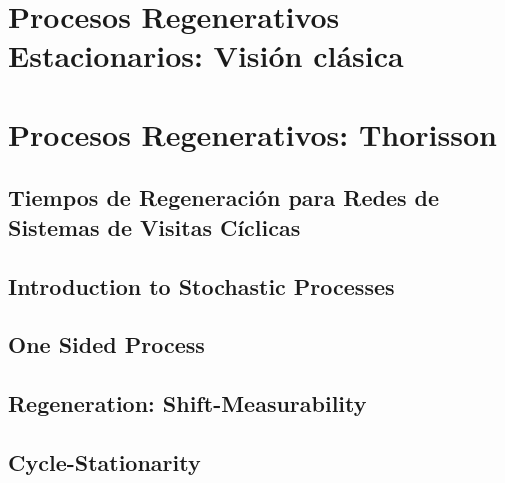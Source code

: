 \documentclass{article}
\begin{document}
\section{Procesos Regenerativos Estacionarios: Visi\'on cl\'asica}

\section{Procesos Regenerativos: Thorisson}


\subsection{Tiempos de Regeneraci\'on para Redes de Sistemas de Visitas C\'iclicas}


\subsection{Introduction to Stochastic Processes}

\subsection{One Sided Process}

\subsection{Regeneration: Shift-Measurability}

\subsection{Cycle-Stationarity}
\end{document}
